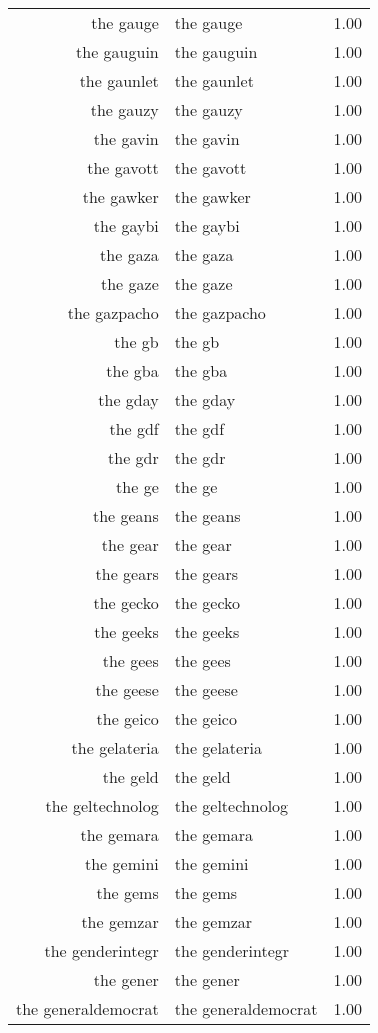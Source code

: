 \begin{table}[ht]
\begin{tabular}{rlr}
  the gauge & the gauge & 1.00 \\ 
  the gauguin & the gauguin & 1.00 \\ 
  the gaunlet & the gaunlet & 1.00 \\ 
  the gauzy & the gauzy & 1.00 \\ 
  the gavin & the gavin & 1.00 \\ 
  the gavott & the gavott & 1.00 \\ 
  the gawker & the gawker & 1.00 \\ 
  the gaybi & the gaybi & 1.00 \\ 
  the gaza & the gaza & 1.00 \\ 
  the gaze & the gaze & 1.00 \\ 
  the gazpacho & the gazpacho & 1.00 \\ 
  the gb & the gb & 1.00 \\ 
  the gba & the gba & 1.00 \\ 
  the gday & the gday & 1.00 \\ 
  the gdf & the gdf & 1.00 \\ 
  the gdr & the gdr & 1.00 \\ 
  the ge & the ge & 1.00 \\ 
  the geans & the geans & 1.00 \\ 
  the gear & the gear & 1.00 \\ 
  the gears & the gears & 1.00 \\ 
  the gecko & the gecko & 1.00 \\ 
  the geeks & the geeks & 1.00 \\ 
  the gees & the gees & 1.00 \\ 
  the geese & the geese & 1.00 \\ 
  the geico & the geico & 1.00 \\ 
  the gelateria & the gelateria & 1.00 \\ 
  the geld & the geld & 1.00 \\ 
  the geltechnolog & the geltechnolog & 1.00 \\ 
  the gemara & the gemara & 1.00 \\ 
  the gemini & the gemini & 1.00 \\ 
  the gems & the gems & 1.00 \\ 
  the gemzar & the gemzar & 1.00 \\ 
  the genderintegr & the genderintegr & 1.00 \\ 
  the gener & the gener & 1.00 \\ 
  the generaldemocrat & the generaldemocrat & 1.00 \\ 

\end{tabular}
\end{table}
